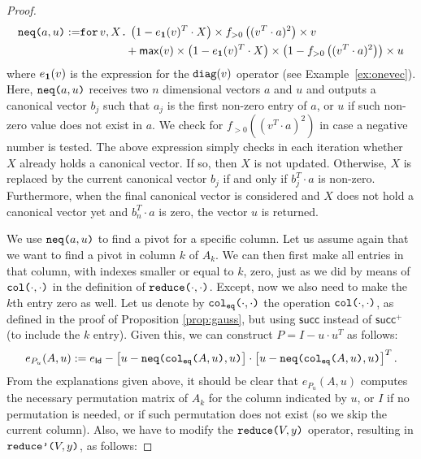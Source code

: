 \begin{proof}
    \begin{align*}
       \texttt{neq(}a,u\texttt{)} := &\texttt{for}\, v,X \texttt{.}\, \left( 1-e_{\mathbf{1}}(v)^T\cdot X \right) \times f_{>0}\left( ( v^T\cdot a )^2 \right)\times v \\
        &\hspace{4em}+ \mathsf{max}(v)\times\left( 1-e_{\mathbf{1}}(v)^T\cdot X \right)\times \left( 1 - f_{>0}\left( ( v^T\cdot a )^2 \right) \right) \times u \\
    \end{align*}
where $e_{\mathbf{1}}(v)$ is the expression for the $\texttt{diag}(v)$ operator (see Example~\ref{ex:onevec}).
Here, $\texttt{neq(}a,u\texttt{)}$ receives two $n$ dimensional vectors $a$ and $u$ and outputs a 
    canonical vector $b_j$ such that $a_j$ is the first non-zero entry of $a$, or $u$ if such non-zero value does not exist in $a$. We check for $f_{>0}((v^T\cdot a)^2)$ 
    in case a negative number is tested. The above expression simply checks in each iteration
    whether $X$ already holds a canonical vector. If so, then $X$ is not updated. Otherwise,
    $X$ is replaced by the current canonical vector $b_j$ if and only if $b_j^T\cdot a$ is non-zero. Furthermore, when the final canonical vector is considered and $X$ does not hold
    a canonical vector yet and $b_n^T\cdot a$ is zero, the vector $u$ is returned.

    We use $\texttt{neq(}a,u\texttt{)}$ to find a pivot for a specific column. Let us assume again that we
    want to find a pivot in column $k$ of $A_k$. We can then first make all entries in that column, with indexes smaller or equal to $k$, zero, just as we did by means of $\texttt{col(}\cdot,\cdot\texttt{)}$ in the
    definition of $\texttt{reduce(}\cdot,\cdot\texttt{)}$. Except, now we also need to make the $k$th entry zero as well.
    Let us denote by $\texttt{col}_{\texttt{eq}}\texttt{(}\cdot,\cdot\texttt{)}$ the operation $\texttt{col(}\cdot,\cdot\texttt{)}$, as defined in the proof of Proposition \ref{prop:gauss}, but using $\mathsf{succ}$ instead of $\mathsf{succ}^+$ (to include the $k$ entry). Given this, we can construct $P=I-u\cdot u^T$ as follows:
    $$
    e_{P_u}(A,u) := e_{\mathsf{Id}} - \left[ u - \texttt{neq(} \texttt{col}_{\texttt{eq}}\texttt{(}A,u\texttt{)} ,u\texttt{)} \right]\cdot \left[ u - \texttt{neq(} \texttt{col}_{\texttt{eq}}\texttt{(}A,u\texttt{)} ,u\texttt{)} \right]^T.
    $$ 
    From the explanations given above, it should be clear that $e_{P_u}(A,u)$ computes the necessary permutation matrix of $A_k$ for the column indicated by $u$, or $I$
    if no permutation is needed, or if such permutation does not exist (so we skip the current column). Also, we have to modify the $\texttt{reduce(}V,y\texttt{)}$ operator, resulting in $\texttt{reduce'(}V,y\texttt{)}$, as follows:


\end{proof}
